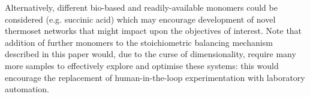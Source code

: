 Alternatively, different bio-based and readily-available monomers 
 could be considered (e.g. succinic acid) which may encourage 
 development of novel thermoset networks that might impact upon the 
 objectives of interest.
Note that addition of further monomers to the stoichiometric balancing
 mechanism described in this paper would, due to the curse of
 dimensionality, require many more samples to effectively explore and
 optimise these systems: this would encourage the replacement of 
 human-in-the-loop experimentation with laboratory automation.